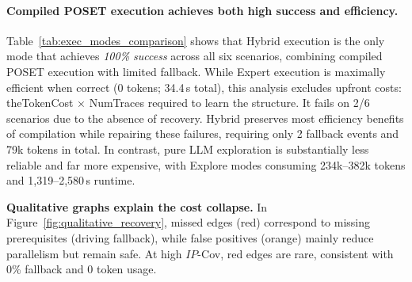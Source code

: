 \documentclass{article}
\theoremstyle{plain}
\theoremstyle{definition}
\theoremstyle{remark}
\begin{document}
\paragraph{Compiled POSET execution achieves both high success and efficiency.}
Table~\ref{tab:exec_modes_comparison} shows that Hybrid execution is the only mode that achieves \emph{100\% success} across all six scenarios, combining compiled POSET execution with limited fallback.
While Expert execution is maximally efficient when correct (0 tokens; 34.4\,s total), this analysis excludes upfront costs: theTokenCost × NumTraces required to learn the structure. It fails on 2/6 scenarios due to the absence of recovery.
Hybrid preserves most efficiency benefits of compilation while repairing these failures, requiring only 2 fallback events and 79k tokens in total.
In contrast, pure LLM exploration is substantially less reliable and far more expensive, with Explore modes consuming 234k–382k tokens and 1{,}319–2{,}580\,s runtime.

\noindent \textbf{Qualitative graphs explain the cost collapse.}
In Figure~\ref{fig:qualitative_recovery}, missed edges (red) correspond to missing prerequisites (driving fallback), while false positives (orange) mainly reduce parallelism but remain safe. 
At high $IP$-Cov, red edges are rare, consistent with 0\% fallback and 0 token usage.
\end{document}
